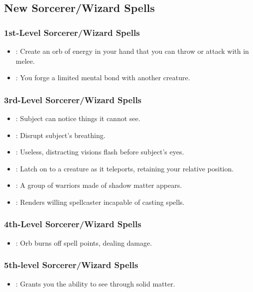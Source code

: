 \subsection{New Sorcerer/Wizard Spells}
\subsubsection{1st-Level Sorcerer/Wizard Spells}
\begin{itemize}
 \item {}: Create an orb of energy in your hand that you can throw or attack with in melee.
 \item {}: You forge a limited mental bond with another creature.
\end{itemize}

\subsubsection{3rd-Level Sorcerer/Wizard Spells}
\begin{itemize}
 \item {}: Subject can notice things it cannot see.
 \item {}: Disrupt subject's breathing.
 \item {}: Useless, distracting visions flash before subject's eyes.
 \item {}: Latch on to a creature as it teleports, retaining your relative position.
 \item {}: A group of warriors made of shadow matter appears.
 \item {}: Renders willing spellcaster incapable of casting spells.
\end{itemize}
\subsubsection{4th-Level Sorcerer/Wizard Spells}
\begin{itemize}
 \item {}: Orb burns off spell points, dealing damage.
\end{itemize}
\subsubsection{5th-level Sorcerer/Wizard Spells}
\begin{itemize} 
 \item {}: Grants you the ability to see through solid matter.
\end{itemize}
